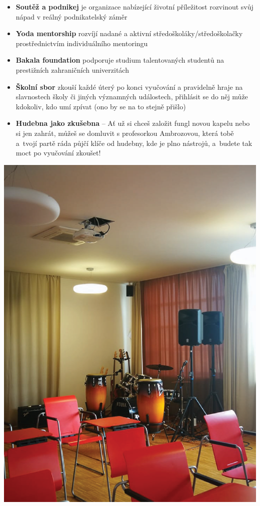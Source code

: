 \documentclass[a5paper, twoside]{article}
\newcommand{\boxik}[2]{
  \begin{tcolorbox}[
    sharp corners,
    colback = #1,
    boxrule = 0pt,
    grow to left by = 25pt,
    grow to right by = 25pt,
    right = 22pt,
    left = 22pt%
  ]
    #2
  \end{tcolorbox}
}
\begin{document}
\vspace{-7pt}
\begin{minipage}{\linewidth}
  \begin{minipage}{.64\linewidth}
    \begin{itemize}[leftmargin=10pt]

    	\item \textbf{Soutěž a podnikej} je organizace nabízející životní příležitost rozvinout svůj nápad v reálný podnikatelský záměr
      \item \textbf{Yoda mentorship} rozvíjí nadané a aktivní středoškoláky/středoškolačky prostřednictvím individuálního mentoringu
      \item \textbf{Bakala foundation} podporuje studium talentovaných studentů na prestižních zahraničních univerzitách
      \item \textbf{Školní sbor} zkouší každé úterý po konci vyučování a pravidelně hraje na slavnostech školy či jiných významných událostech, přihlásit se do něj může kdokoliv, kdo umí zpívat (ono by se na to stejně přišlo)
    	\item \textbf{Hudebna jako zkušebna} -- Ať už si chceš založit fungl novou kapelu nebo si jen zahrát, můžeš se domluvit s profesorkou Ambrozovou, která tobě a~tvojí partě ráda půjčí klíče od hudebny, kde je plno nástrojů, a~budete tak moct po vyučování zkoušet!
    \end{itemize}
  \end{minipage}
  \hfill
  \begin{minipage}{.26\linewidth}
    \boxik{red}{
    \hspace*{-20pt}
    \includegraphics[width=1.29\linewidth]{hudebna.png}
}
\end{minipage}
\end{minipage}
\end{document}
